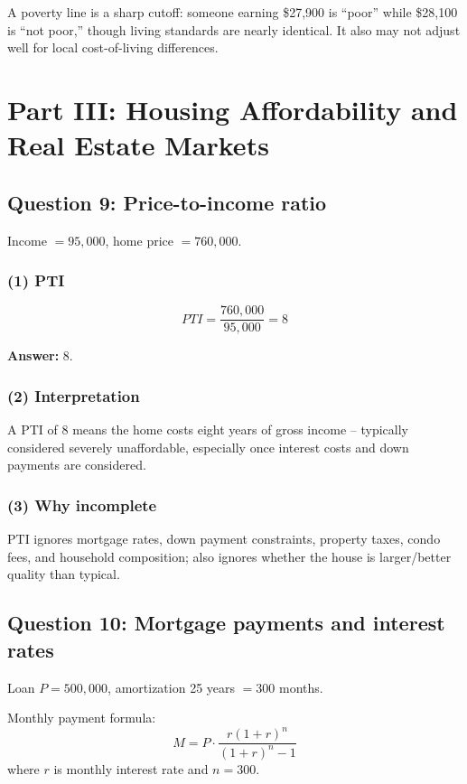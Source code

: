 \documentclass[11pt]{article}
\begin{document}
A poverty line is a sharp cutoff: someone earning \$27,900 is “poor” while \$28,100 is “not poor,” though living standards are nearly identical. It also may not adjust well for local cost-of-living differences.

\section*{Part III: Housing Affordability and Real Estate Markets}

\subsection*{Question 9: Price-to-income ratio}

Income \(=95{,}000\), home price \(=760{,}000\).

\subsubsection*{(1) PTI}

\[
PTI=\frac{760{,}000}{95{,}000}=8
\]

\textbf{Answer:} \(8\).

\subsubsection*{(2) Interpretation}

A PTI of 8 means the home costs eight years of gross income -- typically considered severely unaffordable, especially once interest costs and down payments are considered.

\subsubsection*{(3) Why incomplete}

PTI ignores mortgage rates, down payment constraints, property taxes, condo fees, and household composition; also ignores whether the house is larger/better quality than typical.

\subsection*{Question 10: Mortgage payments and interest rates}

Loan \(P=500{,}000\), amortization 25 years \(=300\) months.

Monthly payment formula:
\[
M = P\cdot \frac{r(1+r)^n}{(1+r)^n-1}
\]
where \(r\) is monthly interest rate and \(n=300\).
\end{document}
